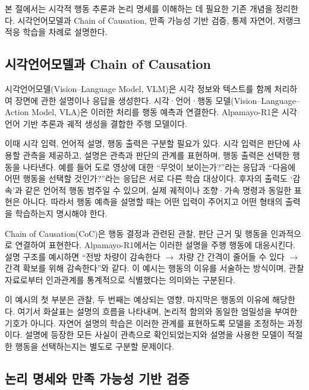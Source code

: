 \documentclass[10pt,a4paper,twocolumn]{article}\usepackage[margin=18mm]{geometry}\usepackage{fontspec,kotex}
\begin{document}
본 절에서는 시각적 행동 추론과 논리 명세를 이해하는 데 필요한 기존 개념을 정리한다. 시각언어모델과 Chain of Causation, 만족 가능성 기반 검증, 통제 자연어, 저랭크 적응 학습을 차례로 설명한다.\par

\subsection{시각언어모델과 Chain of Causation}

시각언어모델(Vision--Language Model, VLM)은 시각 정보와 텍스트를 함께 처리하여 장면에 관한 설명이나 응답을 생성한다. 시각·언어·행동 모델(Vision--Language--Action Model, VLA)은 이러한 처리를 행동 예측과 연결한다. Alpamayo-R1은 시각언어 기반 추론과 궤적 생성을 결합한 주행 모델이다. \cite{r1}\par

이때 시각 입력, 언어적 설명, 행동 출력은 구분할 필요가 있다. 시각 입력은 판단에 사용할 관측을 제공하고, 설명은 관측과 판단의 관계를 표현하며, 행동 출력은 선택한 행동을 나타낸다. 예를 들어 도로 영상에 대한 “무엇이 보이는가?”라는 응답과 “다음에 어떤 행동을 선택할 것인가?”라는 응답은 서로 다른 학습 대상이다. 후자의 출력도 ‘감속’과 같은 언어적 행동 범주일 수 있으며, 실제 궤적이나 조향·가속 명령과 동일한 표현은 아니다. 따라서 행동 예측을 설명할 때는 어떤 입력이 주어지고 어떤 형태의 출력을 학습하는지 명시해야 한다.\par

Chain of Causation(CoC)은 행동 결정과 관련된 관찰, 판단 근거 및 행동을 인과적으로 연결하여 표현한다. Alpamayo-R1에서는 이러한 설명을 주행 행동에 대응시킨다. \cite{r1} 설명 구조를 예시하면 “전방 차량이 감속한다 \ensuremath{\rightarrow} 차량 간 간격이 줄어들 수 있다 \ensuremath{\rightarrow} 간격 확보를 위해 감속한다”와 같다. 이 예시는 행동의 이유를 서술하는 방식이며, 관찰 자료로부터 인과관계를 통계적으로 식별했다는 의미와는 구분된다.\par

이 예시의 첫 부분은 관찰, 두 번째는 예상되는 영향, 마지막은 행동의 이유에 해당한다. 여기서 화살표는 설명의 흐름을 나타내며, 논리적 함의와 동일한 엄밀성을 부여한 기호가 아니다. 자연어 설명의 학습은 이러한 관계를 표현하도록 모델을 조정하는 과정이다. 설명에 등장한 모든 사실이 관측으로 확인되었는지와 설명을 사용한 모델이 적절한 행동을 선택하는지는 별도로 구분할 문제이다.\par

\subsection{논리 명세와 만족 가능성 기반 검증}
\end{document}
